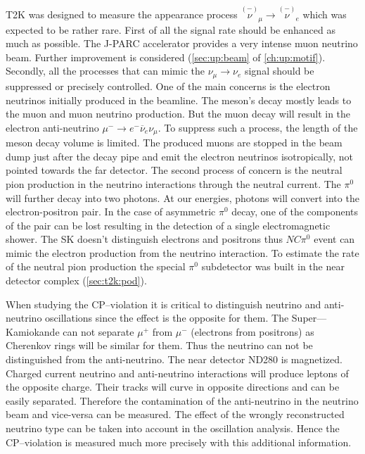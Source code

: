 \documentclass[../main.tex]{subfiles}
\begin{document}
T2K was designed to measure the appearance process $\overset{\scriptscriptstyle(-)}{\nu}_\mu\to\overset{\scriptscriptstyle(-)}{\nu}_e$ which was expected to be rather rare. First of all the signal rate should be enhanced as much as possible. The J-PARC accelerator provides a very intense muon neutrino beam. Further improvement is considered (\autoref{sec:up:beam} of \autoref{ch:up:motif}). Secondly, all the processes that can mimic the $\nu_\mu\to\nu_e$ signal should be suppressed or precisely controlled. One of the main concerns is the electron neutrinos initially produced in the beamline. The meson's decay mostly leads to the muon and muon neutrino production. But the muon decay will result in the electron anti-neutrino $\mu^-\to e^-\overline{\nu}_e\nu_\mu$. To suppress such a process, the length of the meson decay volume is limited. The produced muons are stopped in the beam dump just after the decay pipe and emit the electron neutrinos isotropically, not pointed towards the far detector. The second process of concern is the neutral pion production in the neutrino interactions through the neutral current. The $\pi^0$ will further decay into two photons. At our energies, photons will convert into the electron-positron pair. In the case of asymmetric $\pi^0$ decay, one of the components of the pair can be lost resulting in the detection of a single electromagnetic shower. The SK doesn't distinguish electrons and positrons thus $NC\pi^0$ event can mimic the electron production from the neutrino interaction. To estimate the rate of the neutral pion production the special $\pi^0$ subdetector was built in the near detector complex (\autoref{sec:t2k:pod}).

When studying the CP--violation it is critical to distinguish neutrino and anti-neutrino oscillations since the effect is the opposite for them. The Super---Kamiokande can not separate $\mu^+$ from $\mu^-$ (electrons from positrons) as Cherenkov rings will be similar for them. Thus the neutrino can not be distinguished from the anti-neutrino. The near detector ND280 is magnetized. Charged current neutrino and anti-neutrino interactions will produce leptons of the opposite charge. Their tracks will curve in opposite directions and can be easily separated. Therefore the contamination of the anti-neutrino in the neutrino beam and vice-versa can be measured. The effect of the wrongly reconstructed neutrino type can be taken into account in the oscillation analysis. Hence the CP--violation is measured much more precisely with this additional information.
\end{document}
